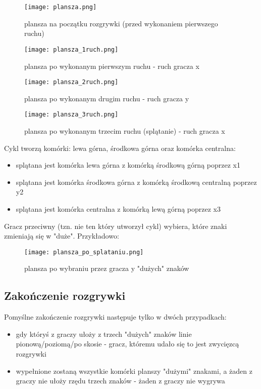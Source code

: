 \documentclass{article}
\begin{document}
\begin{figure}[h]
    \centering
    \texttt{[image: plansza.png]}
    \caption{plansza na początku rozgrywki (przed wykonaniem pierwszego ruchu)}
\end{figure}

\begin{figure}[h]
    \centering
    \texttt{[image: plansza\_1ruch.png]}
    \caption{plansza po wykonanym pierwszym ruchu - ruch gracza x}
\end{figure}

\begin{figure}[h]
    \centering
    \texttt{[image: plansza\_2ruch.png]}
    \caption{plansza po wykonanym drugim ruchu - ruch gracza y}
\end{figure}

\newpage

\begin{figure}[h]
    \centering
    \texttt{[image: plansza\_3ruch.png]}
    \caption{plansza po wykonanym trzecim ruchu (splątanie) - ruch gracza x}
\end{figure}

Cykl tworzą komórki: lewa górna, środkowa górna oraz komórka centralna:

\begin{itemize}
    \item splątana jest komórka lewa górna z komórką środkową górną poprzez x1
    \item splątana jest komórka środkowa górna z komórką środkową centralną poprzez y2
    \item splątana jest komórka centralna z komórką lewą górną poprzez x3
\end{itemize}

Gracz przeciwny (tzn. nie ten który utworzył cykl) wybiera, które znaki zmieniają się w "duże". Przykładowo:

\begin{figure}[h]
    \centering
    \texttt{[image: plansza\_po\_splataniu.png]}
    \caption{plansza po wybraniu przez gracza y "dużych" znaków}
\end{figure}

\newpage

\subsection{Zakończenie rozgrywki}
Pomyślne zakończenie rozgrywki następuje tylko w dwóch przypadkach:\\
\begin{itemize}
    \item gdy któryś z graczy ułoży z trzech "dużych" znaków linie pionową/poziomą/po skosie - gracz, któremu udało się to jest zwycięzcą rozgrywki
    \item wypełnione zostaną wszystkie komórki planszy "dużymi" znakami, a żaden z graczy nie ułoży rzędu trzech znaków - żaden z graczy nie wygrywa
\end{itemize}
\end{document}
